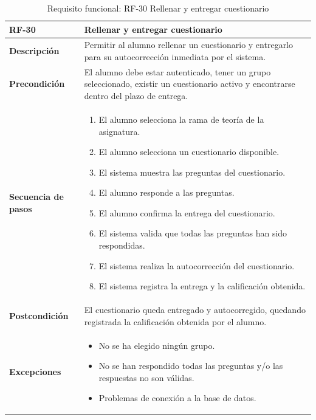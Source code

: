 \begin{table}[H]
\centering
\begin{tabularx}{\textwidth}{
  |>{\centering\arraybackslash}l
  |>{\centering\arraybackslash}X|}
\hline
\textbf{RF-30} & \textbf{Rellenar y entregar cuestionario} \\ \hline

\textbf{Descripción} & Permitir al alumno rellenar un cuestionario y entregarlo para su autocorrección inmediata por el sistema. \\ \hline

\textbf{Precondición} & El alumno debe estar autenticado, tener un grupo seleccionado, existir un cuestionario activo y encontrarse dentro del plazo de entrega. \\ \hline

\textbf{Secuencia de pasos} &
\begin{enumerate}
  \item El alumno selecciona la rama de teoría de la asignatura.
  \item El alumno selecciona un cuestionario disponible.
  \item El sistema muestra las preguntas del cuestionario.
  \item El alumno responde a las preguntas.
  \item El alumno confirma la entrega del cuestionario.
  \item El sistema valida que todas las preguntas han sido respondidas.
  \item El sistema realiza la autocorrección del cuestionario.
  \item El sistema registra la entrega y la calificación obtenida.
\end{enumerate} \\ \hline

\textbf{Postcondición} & El cuestionario queda entregado y autocorregido, quedando registrada la calificación obtenida por el alumno. \\ \hline

\textbf{Excepciones} &
\begin{itemize}
  \item No se ha elegido ningún grupo.
  \item No se han respondido todas las preguntas y/o las respuestas no son válidas.
  \item Problemas de conexión a la base de datos.
\end{itemize} \\ \hline
\end{tabularx}
\caption{Requisito funcional: RF-30 Rellenar y entregar cuestionario}
\label{tab:RF-30}
\end{table}

